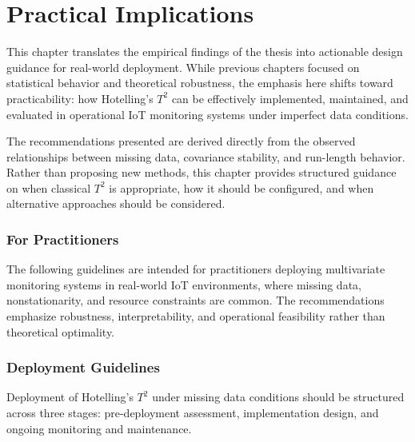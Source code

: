 \clearpage
\section{Practical Implications}

This chapter translates the empirical findings of the thesis into actionable design guidance for real-world deployment. While previous chapters focused on statistical behavior and theoretical robustness, the emphasis here shifts toward practicability: how Hotelling’s $T^2$ can be effectively implemented, maintained, and evaluated in operational \ac{IoT} monitoring systems under imperfect data conditions.

The recommendations presented are derived directly from the observed relationships between missing data, covariance stability, and run-length behavior. Rather than proposing new methods, this chapter provides structured guidance on when classical $T^2$ is appropriate, how it should be configured, and when alternative approaches should be considered.

\subsubsection{For Practitioners}

The following guidelines are intended for practitioners deploying multivariate monitoring systems in real-world \ac{IoT} environments, where missing data, nonstationarity, and resource constraints are common. The recommendations emphasize robustness, interpretability, and operational feasibility rather than theoretical optimality.

\subsubsection{Deployment Guidelines}

Deployment of Hotelling’s $T^2$ under missing data conditions should be structured across three stages: pre-deployment assessment, implementation design, and ongoing monitoring and maintenance.

